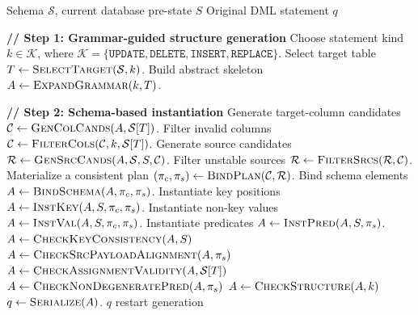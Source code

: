 \begin{algorithm}[!t]
	\caption{Original DML Generation}
	\footnotesize
	\label{alg:original_dml_generation}
	\begin{algorithmic}[1]
		\Require Schema $\mathcal{S}$, current database pre-state $S$
		\Ensure Original DML statement $q$
		
		\State \textbf{// Step 1: Grammar-guided structure generation}
		\State Choose statement kind $k \in \mathcal{K}$, where
		$\mathcal{K}=\{\texttt{UPDATE},\texttt{DELETE},\texttt{INSERT},\texttt{REPLACE}\}$.
		\State Select target table $T \gets \textsc{SelectTarget}(\mathcal{S}, k)$.
		\State Build abstract skeleton $A \gets \textsc{ExpandGrammar}(k, T)$.
		
		\State \textbf{// Step 2: Schema-based instantiation}
		\State Generate target-column candidates $\mathcal{C} \gets \textsc{GenColCands}(A,\mathcal{S}[T])$.
		\State Filter invalid columns $\mathcal{C} \gets \textsc{FilterCols}(\mathcal{C}, k, \mathcal{S}[T])$.
		\State Generate source candidates $\mathcal{R} \gets \textsc{GenSrcCands}(A,\mathcal{S},S,\mathcal{C})$.
		\State Filter unstable sources $\mathcal{R} \gets \textsc{FilterSrcs}(\mathcal{R}, \mathcal{C})$.
		\State Materialize a consistent plan $(\pi_c,\pi_s) \gets \textsc{BindPlan}(\mathcal{C},\mathcal{R})$.
		\State Bind schema elements $A \gets \textsc{BindSchema}(A,\pi_c,\pi_s)$.
		\State Instantiate key positions $A \gets \textsc{InstKey}(A,S,\pi_c,\pi_s)$.
		\State Instantiate non-key values $A \gets \textsc{InstVal}(A,S,\pi_c,\pi_s)$.
		\State Instantiate predicates $A \gets \textsc{InstPred}(A,S,\pi_s)$.
		\State $A \gets \textsc{CheckKeyConsistency}(A,S)$
		\State $A \gets \textsc{CheckSrcPayloadAlignment}(A,\pi_s)$
		\State $A \gets \textsc{CheckAssignmentValidity}(A,\mathcal{S}[T])$
		\State $A \gets \textsc{CheckNonDegeneratePred}(A,\pi_s)$
		\EndIf
		\State $A \gets \textsc{CheckStructure}(A,k)$
		\State $q \gets \textsc{Serialize}(A)$.
		\State \Return $q$
		\Else
		\State restart generation
		\EndIf
	\end{algorithmic}
\end{algorithm}

